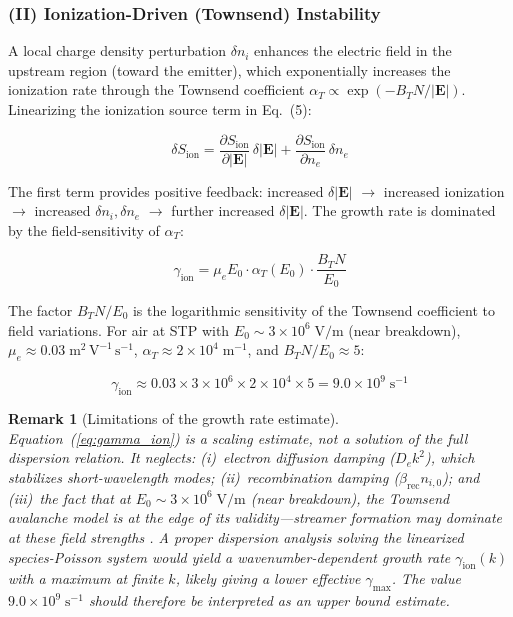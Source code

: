 \documentclass[12pt,twocolumn]{article}
\newtheorem{remark}{Remark}
\newcommand{\ee}{\mathbf{E}}
\begin{document}
\subsubsection{(II) Ionization-Driven (Townsend) Instability}

A local charge density perturbation $\delta n_i$ enhances the
electric field in the upstream region (toward the emitter), which
exponentially increases the ionization rate through the Townsend
coefficient $\alpha_T \propto \exp(-B_T N / |\ee|)$. Linearizing
the ionization source term in Eq.~(5):

\begin{equation}
  \delta S_{\mathrm{ion}}
  = \frac{\partial S_{\mathrm{ion}}}{\partial |\ee|}\,\delta|\ee|
  + \frac{\partial S_{\mathrm{ion}}}{\partial n_e}\,\delta n_e
  \label{eq:ionization_perturbation}
\end{equation}

The first term provides positive feedback: increased $\delta|\ee|$
$\to$ increased ionization $\to$ increased $\delta n_i, \delta n_e$
$\to$ further increased $\delta|\ee|$. The growth rate is dominated
by the field-sensitivity of $\alpha_T$:

\begin{equation}
  \gamma_{\mathrm{ion}}
  = \mu_e E_0 \cdot \alpha_T(E_0)
    \cdot \frac{B_T N}{E_0}
  \label{eq:gamma_ion}
\end{equation}

The factor $B_T N / E_0$ is the logarithmic sensitivity of the
Townsend coefficient to field variations. For air at STP with
$E_0 \sim 3 \times 10^6\;\mathrm{V/m}$ (near breakdown),
$\mu_e \approx 0.03\;\mathrm{m^2\,V^{-1}\,s^{-1}}$,
$\alpha_T \approx 2 \times 10^4\;\mathrm{m^{-1}}$, and
$B_T N / E_0 \approx 5$:

\begin{equation}
  \gamma_{\mathrm{ion}}
  \approx 0.03 \times 3 \times 10^6 \times 2 \times 10^4 \times 5
  = 9.0 \times 10^9\;\mathrm{s^{-1}}
  \label{eq:gamma_ion_num}
\end{equation}

\begin{remark}[Limitations of the growth rate estimate]
Equation~(\ref{eq:gamma_ion}) is a scaling estimate, not a solution
of the full dispersion relation. It neglects: (i)~electron diffusion
damping ($D_e k^2$), which stabilizes short-wavelength modes;
(ii)~recombination damping ($\beta_{\mathrm{rec}} n_{i,0}$); and
(iii)~the fact that at $E_0 \sim 3 \times 10^6\;\mathrm{V/m}$
(near breakdown), the Townsend avalanche model is at the edge of its
validity---streamer formation may dominate at these field strengths
\cite{Raizer1991}. A proper dispersion analysis solving the
linearized species-Poisson system would yield a wavenumber-dependent
growth rate $\gamma_{\mathrm{ion}}(k)$ with a maximum at finite $k$,
likely giving a lower effective $\gamma_{\max}$. The value
$9.0 \times 10^9\;\mathrm{s^{-1}}$ should therefore be interpreted
as an \emph{upper bound estimate}.
\end{remark}
\end{document}
